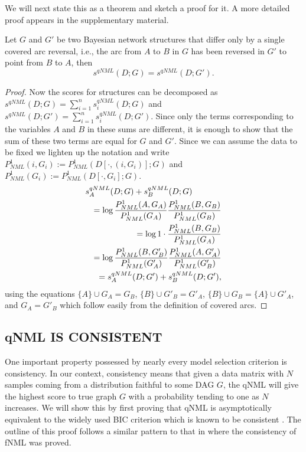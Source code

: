 We will next state this as a
theorem and sketch a proof for it. A more detailed proof appears in the
supplementary material.
\begin{theorem}
  \label{thm:scoreqv}
  Let $G$ and $G'$ be two Bayesian network structures that differ only
  by a single covered arc reversal, i.e., the arc from $A$ to $B$ in $G$
  has been reversed in $G'$ to point from $B$ to $A$, then
  $$s^{qNML}(D;G)=s^{qNML}(D;G').$$
\end{theorem}
\begin{proof}
  Now the scores for structures can be decomposed as
  $s^{qNML}(D;G)=\sum_{i=1}^{n}s_i^{qNML}(D;G)$ and
  $s^{qNML}(D;G')=\sum_{i=1}^{n}s_i^{qNML}(D;G')$.  Since only the
  terms corresponding to the variables $A$ and $B$ in these sums are
  different, it is enough to show that the sum of these two terms are
  equal for $G$ and $G'$. Since we can assume the data to be fixed we
  lighten up the notation and write
  $P^1_{NML}(i,G_i) := P^1_{NML}(D[\cdot,(i,G_i)];G)$ and
  $P^1_{NML}(G_i)   := P^1_{NML}(D[\cdot,G_i];G)$.
  \begin{eqnarray}
    \lefteqn{s_A^{qNML}(D;G)+s_B^{qNML}(D;G)} \nonumber\\
    && =\log\frac{P^1_{NML}(A,G_{A})}{P^1_{NML}(G_{A})}
            \frac{P^1_{NML}(B,G_{B})}{P^1_{NML}(G_{B})}\nonumber\\
    && =\log 1\cdot\frac{P^1_{NML}(B,G_{B})}{P^1_{NML}(G_{A})}\nonumber\\
    && =\log \frac{P^1_{NML}(B,G'_{B})}{P^1_{NML}(G'_{A})}
             \frac{P^1_{NML}(A,G'_{A})}{P^1_{NML}(G'_{B})}\nonumber\\
 && =s_A^{qNML}(D;G')+s_B^{qNML}(D;G'),\nonumber
\end{eqnarray}
  using the equations $\{A\}\cup G_A = G_B$, $\{B\}\cup G'_B = G'_A$,
  $\{B\}\cup G_B = \{A\} \cup G'_A$, and $G_A = G'_B$ which follow
  easily from the definition of covered arcs.
\end{proof}

\subsection{qNML IS CONSISTENT}

One important property possessed by nearly every model selection
criterion is consistency. In our context, consistency means that given
a data matrix with $N$ samples coming from a distribution faithful to
some DAG $G$, the qNML will give the highest score to true graph $G$
with a probability tending to one as $N$ increases. We will show this
by first proving that qNML is asymptotically equivalent to the widely used
BIC criterion which is known to be consistent \cite{Schw78, Haug88}.
The outline of this proof follows a similar pattern to that in
\cite{SilanderIJAR10} where the consistency of fNML was proved.



